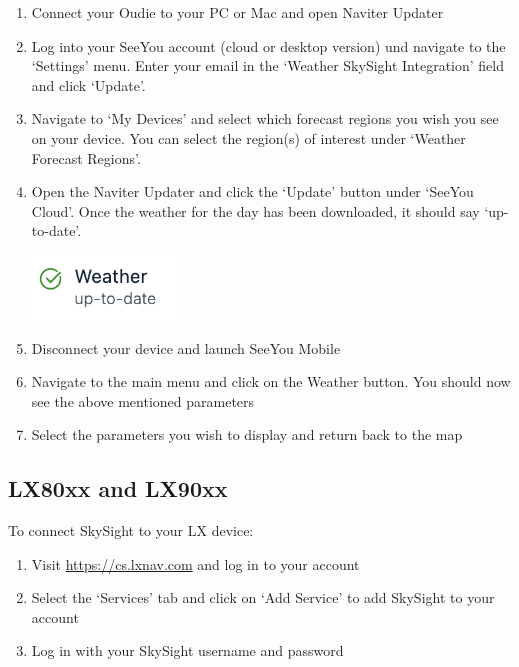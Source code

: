 \documentclass[11pt,a4paper]{article}
\begin{document}
\begin{enumerate}
\item Connect your Oudie to your PC or Mac and open Naviter Updater
\item Log into your SeeYou account (cloud or desktop version) und navigate to the `Settings' menu. Enter your email in the `Weather SkySight Integration' field and click `Update'.



\item Navigate to `My Devices' and select which forecast regions you wish you see on your device. You can select the region(s) of interest under `Weather Forecast Regions'.
\item Open the Naviter Updater and click the `Update' button under `SeeYou Cloud'. Once the weather for the day has been downloaded, it should say `up-to-date'. 

\begin{center}
\includegraphics[width=4cm]{images/weather_downloaded.png}
\end{center}
 
\item Disconnect your device and launch SeeYou Mobile
\item Navigate to the main menu and click on the Weather button. You should now see the above mentioned parameters
\item Select the parameters you wish to display and return back to the map

\end{enumerate}

\subsection{LX80xx and LX90xx}\label{subsec:lx}
To connect SkySight to your LX device:

\begin{enumerate}
\item Visit \url{https://cs.lxnav.com} and log in to your account
\item Select the `Services' tab and click on `Add Service' to add SkySight to your account
\item Log in with your SkySight username and password
\end{enumerate}
\end{document}
